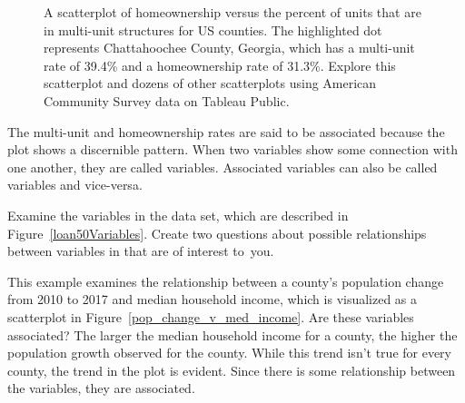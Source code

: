 \begin{figure}[h]
  \centering 

  \caption{A scatterplot of homeownership versus the percent
      of units that are in multi-unit structures for US counties.
      The highlighted dot represents Chattahoochee County, Georgia,
      which has a multi-unit rate of 39.4\% and a homeownership rate
      of 31.3\%. Explore this scatterplot and dozens of other scatterplots using American Community Survey data on Tableau Public.}
  \label{multiunitsVsOwnership}
\end{figure}

The multi-unit and homeownership rates are said to be
associated because the plot shows a discernible pattern.
When two variables show some connection with one another,
they are called  variables.
Associated variables can also be called 
variables and vice-versa.

\D{\newpage}

\begin{exercisewrap}
\begin{nexercise}
Examine the variables in the  data set,
which are described in Figure~\vref{loan50Variables}.
Create two questions about possible relationships
between variables in  that are of interest
to~you.\footnotemark
\end{nexercise}
\end{exercisewrap}

\begin{examplewrap}
\begin{nexample}{This example examines the relationship
    between a county's population change
    from 2010 to 2017
    and median household income,
    which is visualized as a scatterplot in
    Figure~\ref{pop_change_v_med_income}.
    Are these variables associated?}
  The larger the median household income for a county,
  the higher the population growth observed for the county.
  While this trend isn't true for every county,
  the trend in the plot is evident.
  Since there is some relationship between the variables,
  they are associated.
\end{nexample}
\end{examplewrap}

